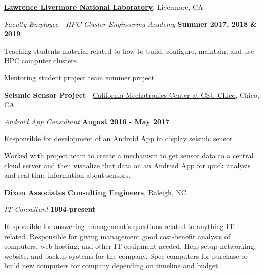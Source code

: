 \documentclass[10pt]{article}
\newcommand{\halfblankline}{\quad\vspace{-0.5\baselineskip}\pagebreak[3]}
\begin{document}
\href{https://www.llnl.gov/}{\textbf{Lawrence Livermore National Laboratory}},
Livermore, CA
\begin{outerlist}

    \item[] \textit{Faculty Employee - HPC Cluster Engineering Academy}%
            \hfill \textbf{Summer 2017, 2018 \& 2019}
            \begin{innerlist}
                \item Teaching students material related to how to build, configure, maintain, and use HPC computer clusters       
                \item Mentoring student project team summer project          
            \end{innerlist}

\end{outerlist}


\halfblankline

{\textbf{Seismic Sensor Project} - \href{https://www.mechatronicscenter.com/}{California Mechatronics Center at CSU Chico}},
Chico, CA
\begin{outerlist}

    \item[] \textit{Android App Consultant}%
            \hfill \textbf{August 2016 - May 2017}
            \begin{innerlist}
                \item Responsible for development of an Android App to display seismic sensor         
                \item Worked with project team to create a mechanism to get sensor data to a central cloud server and then visualize that data on an Android App for quick analysis and real time information about sensors.          
            \end{innerlist}

\end{outerlist}

\halfblankline

\href{http://www.dixonassociates.net/}{\textbf{Dixon Associates Consulting Engineers}},
Raleigh, NC
\begin{outerlist}

\item[] \textit{IT Consultant}%
        \hfill \textbf{1994-present}
\begin{innerlist}
\item Responsible for answering management's questions related to anything IT related. Responsible for giving management good cost-benefit analysis of computers, web hosting, and other IT equipment needed. Help setup networking, website, and backup systems for the company. Spec computers for purchase or build new computers for company depending on timeline and budget. 
\end{innerlist}

\end{outerlist}
\end{document}
